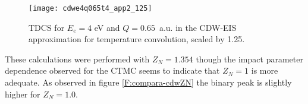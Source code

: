 \begin{figure}[!htpb]
  \centering
\texttt{[image: cdwe4q065t4\_app2\_125]}
  \caption{TDCS for $E_{e}=4$ eV and $Q=0.65$~a.u. in the CDW-EIS approximation for temperature convolution, scaled by 1.25.}
  \label{F:cdwe4q065t4_app2_125}
\end{figure}

These calculations were performed with $Z_{N}=1.354$ though the impact parameter dependence observed for the CTMC seems to indicate that $Z_{N}=1$ is more adequate.  As observed in figure \ref{F:compara-cdwZN} the binary peak is slightly higher for $Z_{N}=1.0$. 


